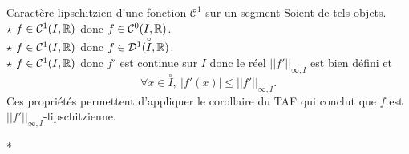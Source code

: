 \documentclass{article}
\begin{document}
\begin{question_kholle}
    {Caractère lipschitzien d'une fonction $\mathcal{C}^1$ sur un segment}
    Soient de tels objets. \\
    $\star$ $f\in \mathcal{C}^1(I, \mathbb R)$ donc $f\in \mathcal{C}^0(I, \mathbb R)$. \\
    $\star$ $f\in \mathcal{C}^1(I,\mathbb R)$ donc $f\in \mathcal{D}^1(\overset{\circ}{I}, \mathbb R)$.\\
    $\star$ $f\in \mathcal{C}^1(I,\mathbb R)$ donc $f'$ est continue sur $I$ donc le réel $||f'||_{\infty,I}$ est bien défini et $$\forall  x \in \overset{\circ}{I}, \ |f'(x)| \leq ||f'||_{\infty,I}.$$ Ces propriétés permettent d'appliquer le corollaire du TAF qui conclut que $f$ est $||f'||_{\infty,I}$-lipschitzienne.
\end{question_kholle}
*
\end{document}

